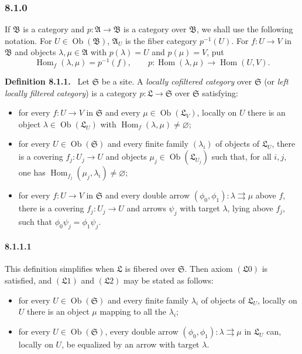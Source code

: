 \documentclass[11pt]{article}
\newcommand{\Hom}{\operatorname{Hom}}
\newcommand{\ob}{\operatorname{Ob}}
\newcommand{\Aa}{\mathfrak{A}}
\newcommand{\Bb}{\mathfrak{B}}
\newcommand{\Ss}{\mathfrak{S}}
\newcommand{\Ll}{\mathfrak{L}}
\newenvironment{statement}[1]{\par\medskip\noindent\textbf{#1.}\ }{\par\medskip}
\begin{document}
\subsubsection*{8.1.0}
If $\Bb$ is a category and $p:\Aa\to\Bb$ is a category over $\Bb$, we shall use the following notation. For $U\in\ob(\Bb)$, $\Aa_U$ is the fiber category $p^{-1}(U)$. For $f:U\to V$ in $\Bb$ and objects $\lambda,\mu\in\Aa$ with $p(\lambda)=U$ and $p(\mu)=V$, put
\[
        \Hom_f(\lambda,\mu)=p^{-1}(f),\qquad
        p:\Hom(\lambda,\mu)\to\Hom(U,V).
\]

\begin{statement}{Definition 8.1.1}
Let $\Ss$ be a site. A \emph{locally cofiltered category} over $\Ss$ (or \emph{left locally filtered category}) is a category $p:\Ll\to\Ss$ over $\Ss$ satisfying:
\begin{itemize}
\item[($\Ll0$)] for every $f:U\to V$ in $\Ss$ and every $\mu\in\ob(\Ll_V)$, locally on $U$ there is an object $\lambda\in\ob(\Ll_U)$ with $\Hom_f(\lambda,\mu)\neq\varnothing$;
\item[($\Ll1$)] for every $U\in\ob(\Ss)$ and every finite family $(\lambda_i)$ of objects of $\Ll_U$, there is a covering $f_j:U_j\to U$ and objects $\mu_j\in\ob(\Ll_{U_j})$ such that, for all $i,j$, one has $\Hom_{f_j}(\mu_j,\lambda_i)\neq\varnothing$;
\item[($\Ll2$)] for every $f:U\to V$ in $\Ss$ and every double arrow $(\phi_0,
\phi_1):\lambda\rightrightarrows\mu$ above $f$, there is a covering $f_j:U_j\to U$ and arrows $\psi_j$ with target $\lambda$, lying above $f_j$, such that $\phi_0\psi_j=\phi_1\psi_j$.
\end{itemize}
\end{statement}

\paragraph*{8.1.1.1}
This definition simplifies when $\Ll$ is fibered over $\Ss$. Then axiom $(\Ll0)$ is satisfied, and $(\Ll1)$ and $(\Ll2)$ may be stated as follows:
\begin{itemize}
\item[($\Ll'1$)] for every $U\in\ob(\Ss)$ and every finite family $\lambda_i$ of objects of $\Ll_U$, locally on $U$ there is an object $\mu$ mapping to all the $\lambda_i$;
\item[($\Ll'2$)] for every $U\in\ob(\Ss)$, every double arrow $(\phi_0,
\phi_1):\lambda\rightrightarrows\mu$ in $\Ll_U$ can, locally on $U$, be equalized by an arrow with target $\lambda$.
\end{itemize}
\end{document}

